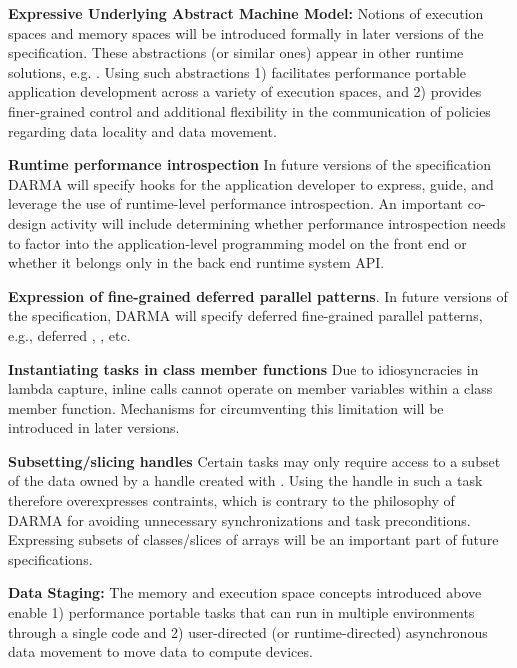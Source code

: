 \begin{compactdesc}
\item{\bf Expressive Underlying Abstract Machine Model:}
Notions of \glspl{execution space} and \glspl{memory space} will be introduced
formally in later
versions of the specification.  These abstractions (or similar ones) appear in other runtime
solutions, e.g. \cite{Kokkos, RAJA}. 
   Using such abstractions 1) facilitates performance portable application development across 
  a variety of \glspl{execution space}, and 2)
  provides finer-grained control and additional flexibility in the
  communication of policies regarding data locality and data movement. 
\item{\bf Runtime performance introspection}
  In future versions of the specification \gls{DARMA} will specify hooks for the
  application developer to express, guide, and leverage the use of runtime-level
  performance \gls{introspection}. An important \gls{co-design} activity will include determining
  whether performance \gls{introspection} needs to factor into the
  application-level \gls{programming
  model} on the \gls{front end} or whether it belongs only in the \gls{back end} 
  \gls{runtime system} \gls{API}.
\item{\bf Expression of fine-grained deferred parallel patterns}.
  In future versions of the specification, \gls{DARMA} will 
  specify deferred fine-grained parallel patterns, e.g., deferred
  , , etc.
\item{\bf Instantiating tasks in class member functions}
  Due to idiosyncracies in \CC{} \gls{lambda} \gls{capture}, inline \cwork calls cannot operate on member variables
 within a class member function. 
 Mechanisms for circumventing this \CC{} limitation will be introduced in later versions.
\item{\bf Subsetting/slicing handles}
  Certain \glspl{task} may only require access to a subset of the data owned by
  a handle created with .
  Using the \gls{handle} in such a \gls{task} therefore overexpresses
  contraints, which is contrary to the philosophy of \gls{DARMA} for avoiding
  unnecessary synchronizations and \gls{task} preconditions.
 Expressing subsets of classes/slices of arrays will be an important part of future specifications.
\item {\bf Data Staging:}
The memory and execution space concepts introduced above enable 1) performance portable tasks that can run in 
multiple environments through a single code and 2) user-directed (or runtime-directed) asynchronous data movement to move data to compute devices.

\end{compactdesc}
